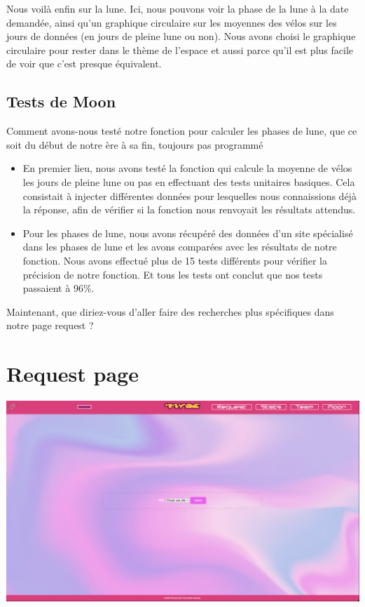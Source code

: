 \documentclass{article}
\begin{document}
Nous voilà enfin sur la lune. Ici, nous pouvons voir la phase de la lune à la date demandée, ainsi qu'un graphique circulaire sur les moyennes des vélos sur les jours de données (en jours de pleine lune ou non). Nous avons choisi le graphique circulaire pour rester dans le thème de l'espace et aussi parce qu'il est plus facile de voir que c'est presque équivalent.
\subsection{Tests de Moon}
    Comment avons-nous testé notre fonction pour calculer les phases de lune, que ce soit du début de notre ère à sa fin, toujours pas programmé

\begin{itemize}
    \item En premier lieu, nous avons testé la fonction qui calcule la moyenne de vélos les jours de pleine lune ou pas en effectuant des tests unitaires basiques. Cela consistait à injecter différentes données pour lesquelles nous connaissions déjà la réponse, afin de vérifier si la fonction nous renvoyait les résultats attendus. \\

     \item Pour les phases de lune, nous avons récupéré des données d'un site spécialisé dans les phases de lune et les avons comparées avec les résultats de notre fonction. Nous avons effectué plus de 15 tests différents pour vérifier la précision de notre fonction. Et tous les tests ont conclut que nos tests passaient à 96\%.\\
\end{itemize}

Maintenant, que diriez-vous d'aller faire des recherches plus spécifiques dans notre page request ?

\section{Request page}

\begin{center}
    \includegraphics[scale=0.3]{logo/request.png}
\end{center}
\end{document}
